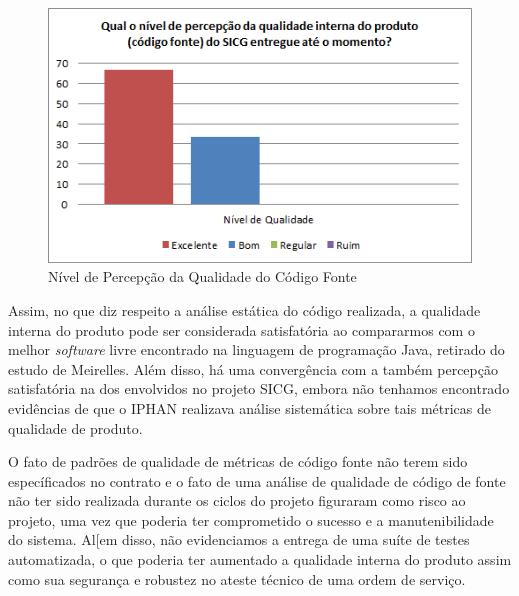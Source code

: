 \begin{figure}[h]
		\centering
			\includegraphics[scale=0.7]{figuras/percepcaoqualidade.png}
		\caption{Nível de Percepção da Qualidade do Código Fonte}
		\label{percepcaoqualidade}
\end{figure}

Assim, no que diz respeito a análise estática do código realizada, a qualidade interna do produto pode ser considerada satisfatória ao compararmos com o melhor \textit{software} livre encontrado na linguagem de programação Java, retirado do estudo de Meirelles. Além disso, há uma convergência com a também percepção satisfatória na dos envolvidos no projeto SICG, embora não tenhamos encontrado evidências de que o IPHAN realizava análise sistemática sobre tais métricas de qualidade de produto.

O fato de padrões de qualidade de métricas de código fonte não terem sido específicados no contrato e o fato de uma análise de qualidade de código de fonte não ter sido realizada durante os ciclos do projeto figuraram como risco ao projeto, uma vez que poderia ter comprometido o sucesso e a manutenibilidade do sistema. Al[em disso, não evidenciamos a entrega de uma suíte de testes automatizada, o que poderia ter aumentado a qualidade interna do produto assim como sua segurança e robustez no ateste técnico de uma ordem de serviço.